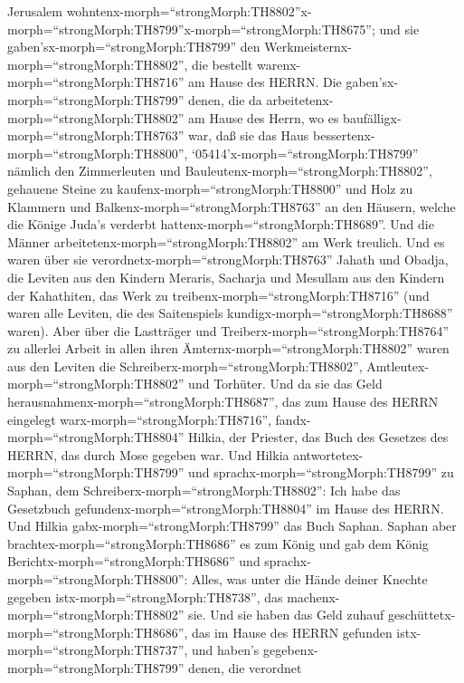 Jerusalem
wohntenx-morph=``strongMorph:TH8802''x-morph=``strongMorph:TH8799''\textbar x-morph=``strongMorph:TH8675'';
 und sie gaben'sx-morph=``strongMorph:TH8799'' den
Werkmeisternx-morph=``strongMorph:TH8802'', die bestellt
warenx-morph=``strongMorph:TH8716'' am Hause des HERRN. Die
gaben'sx-morph=``strongMorph:TH8799'' denen, die da
arbeitetenx-morph=``strongMorph:TH8802'' am Hause des Herrn, wo es
baufälligx-morph=``strongMorph:TH8763'' war, daß sie das Haus
bessertenx-morph=``strongMorph:TH8800'', 
`05414'\textbar x-morph=``strongMorph:TH8799'' nämlich den Zimmerleuten
und Bauleutenx-morph=``strongMorph:TH8802'', gehauene Steine zu
kaufenx-morph=``strongMorph:TH8800'' und Holz zu Klammern und
Balkenx-morph=``strongMorph:TH8763'' an den Häusern, welche die Könige
Juda's verderbt hattenx-morph=``strongMorph:TH8689''.  Und
die Männer arbeitetenx-morph=``strongMorph:TH8802'' am Werk treulich.
Und es waren über sie verordnetx-morph=``strongMorph:TH8763'' Jahath und
Obadja, die Leviten aus den Kindern Meraris, Sacharja und Mesullam aus
den Kindern der Kahathiten, das Werk zu
treibenx-morph=``strongMorph:TH8716'' (und waren alle Leviten, die des
Saitenspiels kundigx-morph=``strongMorph:TH8688'' waren). 
Aber über die Lastträger und Treiberx-morph=``strongMorph:TH8764'' zu
allerlei Arbeit in allen ihren Ämternx-morph=``strongMorph:TH8802''
waren aus den Leviten die Schreiberx-morph=``strongMorph:TH8802'',
Amtleutex-morph=``strongMorph:TH8802'' und Torhüter.  Und
da sie das Geld herausnahmenx-morph=``strongMorph:TH8687'', das zum
Hause des HERRN eingelegt warx-morph=``strongMorph:TH8716'',
fandx-morph=``strongMorph:TH8804'' Hilkia, der Priester, das Buch des
Gesetzes des HERRN, das durch Mose gegeben war.  Und Hilkia
antwortetex-morph=``strongMorph:TH8799'' und
sprachx-morph=``strongMorph:TH8799'' zu Saphan, dem
Schreiberx-morph=``strongMorph:TH8802'': Ich habe das Gesetzbuch
gefundenx-morph=``strongMorph:TH8804'' im Hause des HERRN. Und Hilkia
gabx-morph=``strongMorph:TH8799'' das Buch Saphan.  Saphan
aber brachtex-morph=``strongMorph:TH8686'' es zum König und gab dem
König Berichtx-morph=``strongMorph:TH8686'' und
sprachx-morph=``strongMorph:TH8800'': Alles, was unter die Hände deiner
Knechte gegeben istx-morph=``strongMorph:TH8738'', das
machenx-morph=``strongMorph:TH8802'' sie.  Und sie haben
das Geld zuhauf geschüttetx-morph=``strongMorph:TH8686'', das im Hause
des HERRN gefunden istx-morph=``strongMorph:TH8737'', und haben's
gegebenx-morph=``strongMorph:TH8799'' denen, die verordnet
